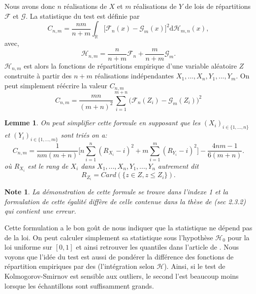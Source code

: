 \documentclass[a4paper,10pt]{article}
\newtheorem{lemma}{Lemme}
\newtheorem{note}{Note}
\begin{document}
Nous avons donc $n$ réalisations de $X$ et $m$ réalisations de $Y$ de lois de répartitions $\mathcal{F}$ et $\mathcal{G}$.
La statistique du test est définie par
\begin{equation}
	C_{n,m}=\frac{nm}{n+m}\int_{\mathbb{R}}\big[ \mathcal{F}_{n}(x)-\mathcal{G}_{m}(x)\big]^{2} \mathrm{d} \mathcal{H}_{m,n}(x),
\end{equation}
avec,
\begin{equation}
	\mathcal{H}_{n,m}=\frac{n}{n+m}\mathcal{F}_n+\frac{m}{n+m}\mathcal{G}_m.
\end{equation}
$\mathcal{H}_{n,m}$ est alors la fonctions de répartitions empirique d'une variable aléatoire $Z$ construite à partir des $n+m$ réalisations indépendantes $X_1,...,X_n,Y_1,...,Y_m$. On peut simplement réécrire la valeur $C_{n,m}$
\begin{equation}
	C_{n,m}=\frac{mn}{(m+n)^2}\sum_{i=1}^{m+n}\big(\mathcal{F}_n(Z_i)-\mathcal{G}_{m}(Z_i)\big)^2
\end{equation}

\begin{lemma}
	\label{C-v}
	On peut simplifier cette formule en supposant que les $(X_i)_{i\in \{1,...,n\}}$ et $(Y_i)_{i\in \{1,...,m\}}$ sont triés on a:
	\begin{equation}
		C_{n,m}=\frac{1}{nm(m+n)}\Big[ n\sum_{i=1}^{n}(R_{X_i}-i)^2+ m\sum_{i=1}^{m}(R_{Y_i}-i)^2\Big]-\frac{4nm-1}{6(m+n)}.
	\end{equation}
	où $R_{X_i}$ est le rang de $X_i$ dans $X_1,...,X_n,Y_1,...,Y_n$ autrement dit 
	\[R_{Z_i}=Card(\{z\in Z, z\leq Z_i\}).\] 
\end{lemma}

\begin{note}
	La démonstration de cette formule se trouve dans l'indexe 1 et la formulation de cette égalité diffère de celle contenue dans la thèse de \cite{ethier2011propos}(sec 2.3.2) qui contient une erreur.
\end{note}
Cette formulation a le bon goût de nous indiquer que la statistique ne dépend pas de la loi. On peut calculer simplement sa statistique sous l'hypothèse $\mathcal{H}_0$ pour la loi uniforme sur $[0,1]$ et ainsi retrouver les quantiles dans l'article de \cite{buning2002robustness}. Nous voyons que l'idée du test est aussi de pondérer la différence des fonctions de répartition empiriques par des (l'intégration selon $\mathcal{H}$). Ainsi, si le test de Kolmogorov-Smirnov est sensible aux outliers, le second l’est beaucoup moins lorsque les échantillons sont suffisamment grands.
\end{document}
